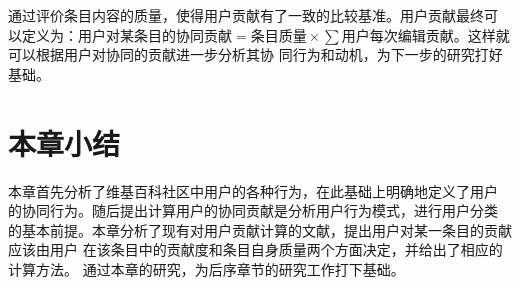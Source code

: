 通过评价条目内容的质量，使得用户贡献有了一致的比较基准。用户贡献最终可
以定义为：$\text{用户对某条目的协同贡献}=\text{条目质量} \times \sum
\text{用户每次编辑贡献}$。这样就可以根据用户对协同的贡献进一步分析其协
同行为和动机，为下一步的研究打好基础。

\section*{本章小结}
本章首先分析了维基百科社区中用户的各种行为，在此基础上明确地定义了用户
的协同行为。随后提出计算用户的协同贡献是分析用户行为模式，进行用户分类
的基本前提。本章分析了现有对用户贡献计算的文献，提出用户对某一条目的贡献应该由用户
在该条目中的贡献度和条目自身质量两个方面决定，并给出了相应的计算方法。
通过本章的研究，为后序章节的研究工作打下基础。


